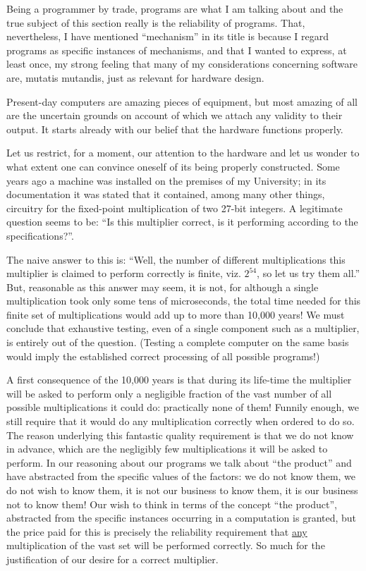Being a programmer by trade, programs are what I am talking about
and the true subject of this section really is the reliability of
programs. That, nevertheless, I have mentioned ``mechanism'' in its
title is because I regard programs as specific instances of
mechanisms, and that I wanted to express, at least once, my strong
feeling that many of my considerations concerning software are,
mutatis mutandis, just as relevant for hardware design.

Present-day computers are amazing pieces of equipment, but most
amazing of all are the uncertain grounds on account of which we
attach any validity to their output. It starts already with our
belief that the hardware functions properly.

Let us restrict, for a moment, our attention to the hardware and
let us wonder to what extent one can convince oneself of its being
properly constructed. Some years ago a machine was installed on the
premises of my University; in its documentation it was stated that
it contained, among many other things, circuitry for the fixed-point
multiplication of two 27-bit integers. A legitimate question seems to
be: ``Is this multiplier correct, is it performing according to the
specifications?''.

The naive answer to this is: ``Well, the number of different
multiplications this multiplier is claimed to perform correctly is
finite, viz. $2^{54}$, so let us try them all.'' But, reasonable as
this answer may seem, it is not, for although a single multiplication
took only some tens of microseconds, the total time needed for this
finite set of multiplications would add up to more than 10,000 years!
We must conclude that exhaustive testing, even of a single component
such as a multiplier, is entirely out of the question. (Testing a
complete computer on the same basis would imply the established
correct processing of all possible programs!)

A first consequence of the 10,000 years is that during its life-time
the multiplier will be asked to perform only a negligible fraction of
the vast number of all possible multiplications it could do: practically
none of them! Funnily enough, we still require that it would do any
multiplication correctly when ordered to do so. The reason underlying
this fantastic quality requirement is that we do not know in advance,
which are the negligibly few multiplications it will be asked to perform.
In our reasoning about our programs we talk about ``the product'' and have
abstracted from the specific values of the factors: we do not know them,
we do not wish to know them, it is not our business to know them, it is
our business not to know them! Our wish to think in terms of the concept
``the product'', abstracted from the specific instances occurring in a
computation is granted, but the price paid for this is precisely the
reliability requirement that \underline{any} multiplication of the vast
set will be performed correctly. So much for the justification of our
desire for a correct multiplier.


